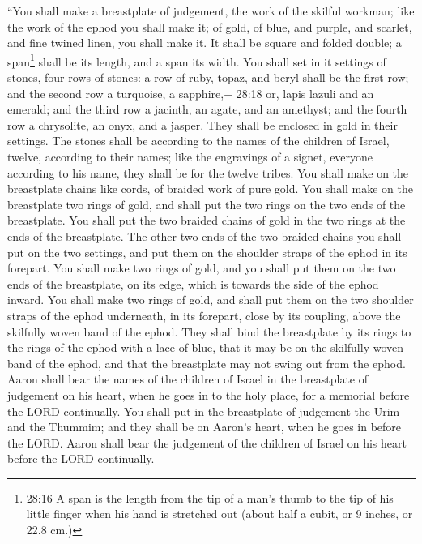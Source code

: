  ``You shall make a breastplate of judgement, the work of
the skilful workman; like the work of the ephod you shall make it; of
gold, of blue, and purple, and scarlet, and fine twined linen, you shall
make it.  It shall be square and folded double; a
span\footnote{28:16 A span is the length from the tip of a man's thumb
  to the tip of his little finger when his hand is stretched out (about
  half a cubit, or 9 inches, or 22.8 cm.)} shall be its length, and a
span its width.  You shall set in it settings of stones,
four rows of stones: a row of ruby, topaz, and beryl shall be the first
row;  and the second row a turquoise, a sapphire,+ 28:18
or, lapis lazuli and an emerald;  and the third row a
jacinth, an agate, and an amethyst;  and the fourth row a
chrysolite, an onyx, and a jasper. They shall be enclosed in gold in
their settings.  The stones shall be according to the names
of the children of Israel, twelve, according to their names; like the
engravings of a signet, everyone according to his name, they shall be
for the twelve tribes.  You shall make on the breastplate
chains like cords, of braided work of pure gold.  You shall
make on the breastplate two rings of gold, and shall put the two rings
on the two ends of the breastplate.  You shall put the two
braided chains of gold in the two rings at the ends of the breastplate.
 The other two ends of the two braided chains you shall put
on the two settings, and put them on the shoulder straps of the ephod in
its forepart.  You shall make two rings of gold, and you
shall put them on the two ends of the breastplate, on its edge, which is
towards the side of the ephod inward.  You shall make two
rings of gold, and shall put them on the two shoulder straps of the
ephod underneath, in its forepart, close by its coupling, above the
skilfully woven band of the ephod.  They shall bind the
breastplate by its rings to the rings of the ephod with a lace of blue,
that it may be on the skilfully woven band of the ephod, and that the
breastplate may not swing out from the ephod.  Aaron shall
bear the names of the children of Israel in the breastplate of judgement
on his heart, when he goes in to the holy place, for a memorial before
the LORD continually.  You shall put in the breastplate of
judgement the Urim and the Thummim; and they shall be on Aaron's heart,
when he goes in before the LORD. Aaron shall bear the judgement of the
children of Israel on his heart before the LORD continually.

